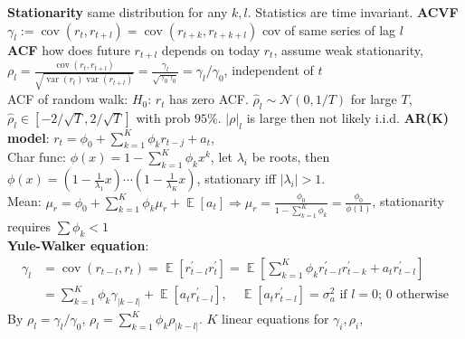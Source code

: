 \documentclass[10pt,landscape, a4paper]{article}
\theoremstyle{remark}
\newcommand{\var}{\operatorname{var}}
\newcommand{\E}{\operatorname{\mathbb{E}}}
\newcommand{\abs}[1]{\left\lvert #1 \right\rvert}
\newcommand{\cov}[1]{\operatorname{cov}(#1)}
\begin{document}
\begin{multicols*}{3}
\textbf{Stationarity} same distribution for any $k,l$. Statistics are time invariant.
\textbf{ACVF} $\gamma_l := \cov{r_t, r_{t+l}} = \cov{r_{t+k}, r_{t+k+l}}$ cov of same series of lag $l$\\
\textbf{ACF} how does future $r_{t+l}$ depends on today $r_t$, assume weak stationarity, $\rho_l = \frac{\cov{r_t, r_{t+l}}}{\sqrt{\var(r_t)\var(r_{t+l})}} = \frac{\gamma_l}{\sqrt{\gamma_0 \gamma_0}} = \gamma_l / \gamma_0$, independent of $t$\\
ACF of random walk: $H_0$: $r_t$ has zero ACF. $\hat{\rho}_l \sim \mathcal{N} (0, 1/T)$ for large $T$, $\hat{\rho}_l \in [-2/\sqrt{T}, 2/\sqrt{T}]$ with prob $95\%$. $\abs{\rho}_l$ is large then not likely i.i.d.
\newline
\textbf{AR(K) model}: $r_t = \phi_0 + \sum^K_{k=1} \phi_k r_{t-j} + a_t$, \\
Char func: $\phi (x) = 1 - \sum^K_{k=1} \phi_k x^k$, let $\lambda_i$ be roots, then $\phi (x) = (1- \frac{1}{\lambda_1}x)\cdots (1- \frac{1}{\lambda_K}x)$, stationary iff $\abs{\lambda_i} > 1$.\\
Mean: $\mu_r = \phi_0 + \sum^K_{k=1} \phi_k \mu_r + \E [a_t] \Rightarrow \mu_r = \frac{\phi_0}{1 - \sum^K_{k=1} \phi_k} = \frac{\phi_0}{\phi (1)}$, stationarity requires $\sum \phi_k < 1$\\
\textbf{Yule-Walker equation}: 
\vspace{-7pt}
\begin{align*}
    \gamma_l &= \cov{r_{t-l}, r_t} = \E [r^\prime_{t-l} r^\prime_t]=\E [\sum^K_{k=1} \phi_k r^\prime_{t-l} r^\prime_{t-k} + a_t r^\prime_{t-l}] \\[-5pt]
    &= \sum^K_{k=1}\phi_k \gamma_{\abs{k-l}} + \E [a_t r^\prime_{t-l}], \quad \text{$\E [a_t r^\prime_{t-l}]=\sigma^2_a$ if $l=0$; $0$ otherwise}
\end{align*}
By $\rho_l = \gamma_l / \gamma_0$, $\rho_l = \sum^K_{k=1}\phi_k \rho_{\abs{k-l}}$. $K$ linear equations for $\gamma_i, \rho_i$,

\end{multicols*}
\end{document}
